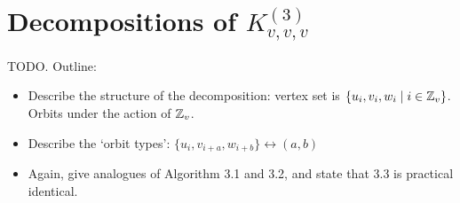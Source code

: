 \section{Decompositions of $K_{v,v,v}^{(3)}$}
\label{sec:methods/gdd}

TODO. Outline:

\begin{itemize}
    \item Describe the structure of the decomposition: vertex set is $\{u_i, v_i, w_i \mid i \in \mathbb{Z}_v\}$. Orbits under the action of $\mathbb{Z}_v$.
    \item Describe the `orbit types': $\{u_i, v_{i+a}, w_{i+b}\} \leftrightarrow (a, b)$
    \item Again, give analogues of Algorithm 3.1 and 3.2, and state that 3.3 is practical identical.
\end{itemize}
